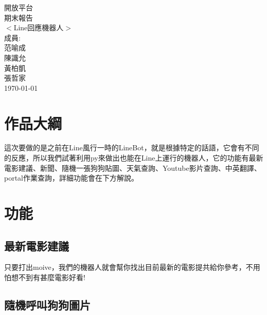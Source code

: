 \documentclass{scrreprt}
\date{}
\begin{document}
\begin{CJK}{UTF8}{bkai}
\begin{center}
    \begin{bfseries}
        \Huge{開放平台\\期末報告}\\
        \vspace{3.8cm}
        $<$Line回應機器人$>$\\
        \vspace{1.9cm}
        \LARGE{成員:}\\
        \vspace{1.0cm}
        范喻成\\
        \vspace{0.5cm}
        陳識允\\
        \vspace{0.5cm}
        黃柏凱\\
        \vspace{0.5cm}
        張哲家\\
        \vspace{0.5cm}
        \today\\
    \end{bfseries}
\end{center}

\tableofcontents

\chapter{作品大綱}

這次要做的是之前在Line風行一時的LineBot，就是根據特定的話語，它會有不同的反應，所以我們試著利用py來做出也能在Line上運行的機器人，它的功能有{\color{red}最新電影建議}、{\color{red}新聞}、{\color{red}隨機一張狗狗貼圖}、{\color{red}天氣查詢}、{\color{red}Youtube影片查詢}、{\color{red}中英翻譯}、{\color{red}portal作業查詢}，詳細功能會在下方解說。

\chapter{功能}

\section{最新電影建議}

只要打出{\color{red}moive}，我們的機器人就會幫你找出目前最新的電影提共給你參考，不用怕想不到有甚麼電影好看!

\section{隨機呼叫狗狗圖片}


\end{CJK}
\end{document}

